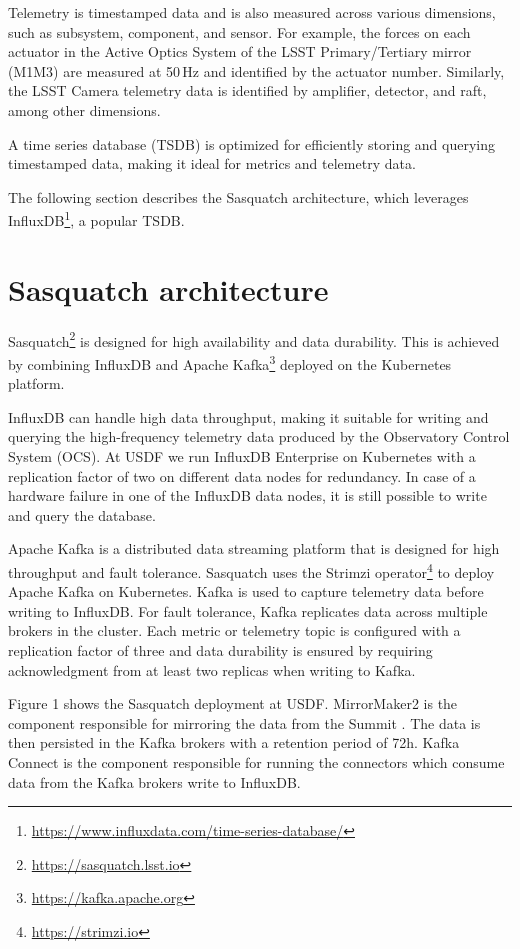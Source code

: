 Telemetry is timestamped data and is also measured across various dimensions, such as subsystem, component, and sensor. For example, the forces on each actuator in the Active Optics System of the LSST Primary/Tertiary mirror (M1M3) are measured at 50\,Hz and identified by the actuator number. Similarly, the LSST Camera telemetry data is identified by amplifier, detector, and raft, among other dimensions.

A time series database (TSDB) is optimized for efficiently storing and querying timestamped data, making it ideal for metrics and telemetry data.

The following section describes the Sasquatch architecture, which leverages InfluxDB\footnote{\url{https://www.influxdata.com/time-series-database/}}, a popular TSDB.

\section{Sasquatch architecture}
\label{sec:arch}

Sasquatch\footnote{\url{https://sasquatch.lsst.io}} is designed for high availability and data durability. This is achieved by combining InfluxDB and Apache Kafka\footnote{\url{https://kafka.apache.org}} deployed on the Kubernetes platform. \cite{SQR-029,SQR-068}

InfluxDB can handle high data throughput, making it suitable for writing and querying the high-frequency telemetry data produced by the Observatory Control System (OCS). At USDF we run InfluxDB Enterprise on Kubernetes with a replication factor of two on different data nodes for redundancy. In case of a hardware failure in one of the InfluxDB data nodes, it is still possible to write and query the database.

Apache Kafka is a distributed data streaming platform that is designed for high throughput and fault tolerance. Sasquatch uses the Strimzi operator\footnote{\url{https://strimzi.io}} to deploy Apache Kafka on Kubernetes. Kafka is used to capture telemetry data before writing to InfluxDB. For fault tolerance, Kafka replicates data across multiple brokers in the cluster. Each metric or telemetry topic is configured with a replication factor of three and data durability is ensured by requiring acknowledgment from at least two replicas when writing to Kafka.

Figure 1 shows the Sasquatch deployment at USDF. MirrorMaker2 is the component responsible for mirroring the data from the Summit \cite{SQR-050}. The data is then persisted in the Kafka brokers with a retention period of 72h. Kafka Connect is the component responsible for running the connectors which consume data from the Kafka brokers write to InfluxDB.

